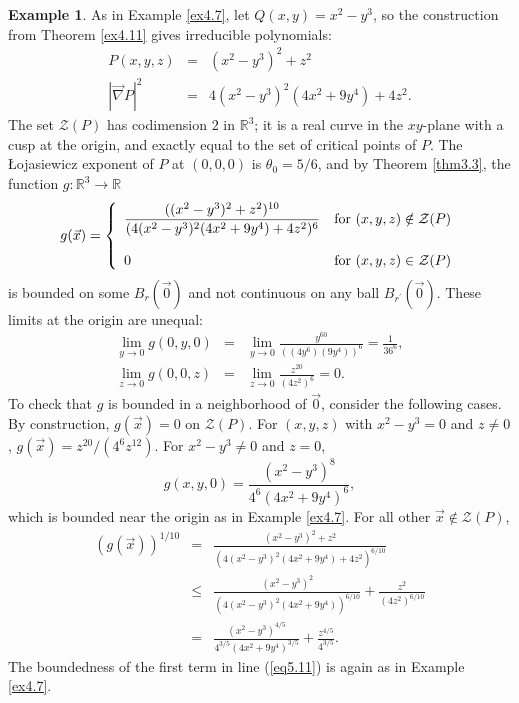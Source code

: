 \documentclass[12pt]{amsart}
\theoremstyle{definition}
\newtheorem{example}[thm]{Example}
\theoremstyle{remark}
\numberwithin{equation}{section}
\newcommand{\re}{\mathbb{R}}
\newcommand{\vv}{\mathcal{Z}}
\begin{document}
\begin{example}\label{ex5.12}
  As in Example \ref{ex4.7}, let $Q(x,y)=x^2-y^3$, so the construction from Theorem \ref{ex4.11} gives irreducible polynomials:
  \begin{eqnarray*}
      P(x,y,z)&=&(x^2-y^3)^2+z^2\\
      |\vec\nabla P|^2&=&4(x^2-y^3)^2(4x^2+9y^4)+4z^2.
  \end{eqnarray*}
  The set $\vv(P)$ has codimension $2$ in $\re^3$; it is a real curve in the $xy$-plane with a cusp at the origin, and exactly equal to the set of critical points of $P$.  The \L ojasiewicz exponent of $P$ at $(0,0,0)$ is $\theta_0=5/6$, and by Theorem \ref{thm3.3}, the function $g:\re^3\to\re$
$$g(\vec x)=\left\{\begin{array}{ll}{\displaystyle{\frac{((x^2-y^3)^2+z^2)^{10}}{(4(x^2-y^3)^2(4x^2+9y^4)+4z^2)^{6}}}} & \mbox{\rm{for} $(x,y,z)\notin\vv(P)$}\\ & \\0& \mbox{\rm{for} $(x,y,z)\in\vv(P)$} \end{array}\right.$$
  is bounded on some $B_r(\vec0)$ and not continuous on any ball $B_{r^\prime}(\vec0)$.
  These limits at the origin are unequal:
  \begin{eqnarray*}
      \lim_{y\to0}g(0,y,0)&=&\lim_{y\to0}\frac{y^{60}}{((4y^6)(9y^4))^6}=\frac1{36^6},\\
      \lim_{z\to0}g(0,0,z)&=&\lim_{z\to0}\frac{z^{20}}{(4z^2)^6}=0.
  \end{eqnarray*}
  To check that $g$ is bounded in a neighborhood of $\vec0$, consider the following cases.  By construction, $g(\vec x)=0$ on $\vv(P)$.  For $(x,y,z)$ with $x^2-y^3=0$ and $z\ne0$, $g(\vec x)=z^{20}/(4^6z^{12})$. 
  For $x^2-y^3\ne0$ and $z=0$, $$g(x,y,0)=\frac{(x^2-y^3)^{8}}{4^6(4x^2+9y^4)^6},$$ which is bounded near the origin as in Example \ref{ex4.7}.  For all other $\vec x\notin\vv(P)$,
  \begin{eqnarray}
      (g(\vec x))^{1/10}&=&{\displaystyle{\frac{(x^2-y^3)^2+z^2}{(4(x^2-y^3)^2(4x^2+9y^4)+4z^2)^{6/10}}}}\nonumber\\
      &\le&\frac{(x^2-y^3)^2}{(4(x^2-y^3)^2(4x^2+9y^4))^{6/10}}+\frac{z^2}{(4z^2)^{6/10}}\nonumber\\
      &=&\frac{(x^2-y^3)^{4/5}}{4^{3/5}(4x^2+9y^4)^{3/5}}+\frac{z^{4/5}}{4^{3/5}}.\label{eq5.11}
  \end{eqnarray}
  The boundedness of the first term in line (\ref{eq5.11}) is again as in Example \ref{ex4.7}.
  

\end{example}
\end{document}

